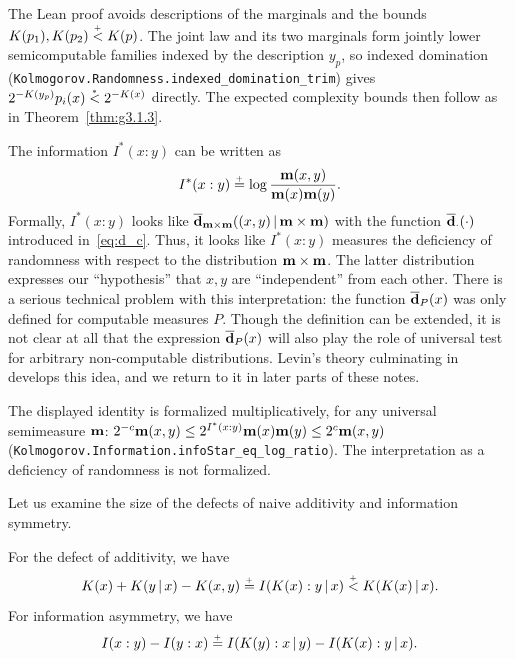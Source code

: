 \begin{formalization}
The Lean proof avoids descriptions of the marginals and the bounds
\( K(p_{1}), K(p_{2}) \stackrel{{}_+}{<} K(p) \). The joint law and its two marginals form jointly lower
semicomputable families indexed by the description \( y_{p} \), so indexed domination
(\texttt{Kolmogorov.Randomness.indexed\_domination\_trim}) gives
\( 2^{-K(y_{p})} p_{i}(x) \stackrel{{}_*}{<} 2^{-K(x)} \) directly. The expected complexity bounds then
follow as in Theorem~\ref{thm:g3.1.3}.
\end{formalization}

 \begin{remark}\label{rem:inf-def-rand}
The information \( I^{*}(x : y) \) can be written as
 \[
   I^{*}(x : y) \stackrel{{}_+}{=} \log \frac{\mathbf{m}(x, y)}{\mathbf{m}(x)\mathbf{m}(y)}.
 \]
Formally, \( I^{*}(x : y) \) looks like 
\( \overline{\mathbf{d}}_{\mathbf{m}\times\mathbf{m}}((x, y) \,\vert\, \mathbf{m} \times \mathbf{m}) \) with the function 
\( \overline{\mathbf{d}}_{\cdot}(\cdot) \) introduced in~\eqref{eq:d_c}.
Thus, it looks like \( I^{*}(x : y) \) measures the deficiency of randomness
with respect to the distribution \( \mathbf{m} \times \mathbf{m} \).
The latter distribution expresses our ``hypothesis'' that \( x,y \) are
``independent'' from each other.
There is a serious technical problem with this interpretation: the function
\( \overline{\mathbf{d}}_{P}(x) \) was only defined for computable measures \( P \).
Though the definition can be extended, it is not clear at all that the
expression \( \overline{\mathbf{d}}_{P}(x) \) will also play the role of universal test
for arbitrary non-computable distributions.
Levin's theory culminating in~\cite{LevinRandCons84} develops this idea,
and we return to it in later parts of these notes.
 \end{remark}

\begin{formalization}
The displayed identity is formalized multiplicatively, for any universal semimeasure
\( \mathbf{m} \): \( 2^{-c} \mathbf{m}(x, y) \le 2^{I^{*}(x : y)} \mathbf{m}(x) \mathbf{m}(y) \le 2^{c} \mathbf{m}(x, y) \)
(\texttt{Kolmogorov.Information.infoStar\_eq\_log\_ratio}). The interpretation as a
deficiency of randomness is not formalized.
\end{formalization}

Let us examine the size of the
defects of naive additivity and information symmetry.

 \begin{corollary}
  \label{cor:g3.1.12}
  \leanok
For the defect of additivity, we have
 \begin{equation}
  K(x) + K(y \,\vert\, x) - K(x, y) \stackrel{{}_+}{=} I(K(x) : y \,\vert\, x)
 \stackrel{{}_+}{<} K(K(x) \,\vert\, x).
  \end{equation}
For information asymmetry, we have
 \begin{equation}
 I(x : y) - I(y : x) \stackrel{{}_+}{=} I(K(y) : x \,\vert\, y) - I(K(x) : y \,\vert\, x).
 \end{equation}
 \end{corollary}

